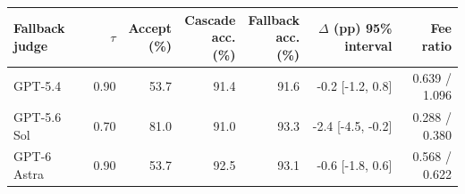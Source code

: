 \begin{tabular}{@{}lrrrrrr@{}}
\toprule
Fallback judge & $\tau$ & \shortstack{Accept\\(\%)} & \shortstack{Cascade\\acc. (\%)} & \shortstack{Fallback\\acc. (\%)} & \shortstack{$\Delta$ (pp)\\95\% interval} & \shortstack{Fee\\ratio} \\
\midrule
GPT-5.4 & 0.90 & 53.7 & 91.4 & 91.6 & -0.2 [-1.2, 0.8] & 0.639 / 1.096 \\
GPT-5.6 Sol & 0.70 & 81.0 & 91.0 & 93.3 & -2.4 [-4.5, -0.2] & 0.288 / 0.380 \\
GPT-6 Astra & 0.90 & 53.7 & 92.5 & 93.1 & -0.6 [-1.8, 0.6] & 0.568 / 0.622 \\
\bottomrule
\end{tabular}
